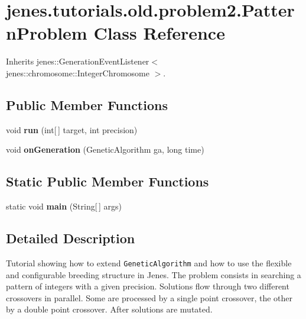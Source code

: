 \hypertarget{classjenes_1_1tutorials_1_1old_1_1problem2_1_1_pattern_problem}{
\section{jenes.tutorials.old.problem2.PatternProblem Class Reference}
\label{classjenes_1_1tutorials_1_1old_1_1problem2_1_1_pattern_problem}
}
Inherits jenes::GenerationEventListener$<$ jenes::chromosome::IntegerChromosome $>$.

\subsection*{Public Member Functions}
\begin{CompactItemize}
\item 
\hypertarget{classjenes_1_1tutorials_1_1old_1_1problem2_1_1_pattern_problem_aeaef4b515a3fe02044c668a69f038a7}{
void \textbf{run} (int\mbox{[}$\,$\mbox{]} target, int precision)}
\label{classjenes_1_1tutorials_1_1old_1_1problem2_1_1_pattern_problem_aeaef4b515a3fe02044c668a69f038a7}

\item 
\hypertarget{classjenes_1_1tutorials_1_1old_1_1problem2_1_1_pattern_problem_1ed3cc6f1e19c0ffa6459e9c50aa9079}{
void \textbf{onGeneration} (GeneticAlgorithm ga, long time)}
\label{classjenes_1_1tutorials_1_1old_1_1problem2_1_1_pattern_problem_1ed3cc6f1e19c0ffa6459e9c50aa9079}

\end{CompactItemize}
\subsection*{Static Public Member Functions}
\begin{CompactItemize}
\item 
\hypertarget{classjenes_1_1tutorials_1_1old_1_1problem2_1_1_pattern_problem_ab48fbec2976973bac23f7d26569453f}{
static void \textbf{main} (String\mbox{[}$\,$\mbox{]} args)}
\label{classjenes_1_1tutorials_1_1old_1_1problem2_1_1_pattern_problem_ab48fbec2976973bac23f7d26569453f}

\end{CompactItemize}


\subsection{Detailed Description}
Tutorial showing how to extend {\tt GeneticAlgorithm} and how to use the flexible and configurable breeding structure in Jenes. The problem consists in searching a pattern of integers with a given precision. Solutions flow through two different crossovers in parallel. Some are processed by a single point crossover, the other by a double point crossover. After solutions are mutated.

